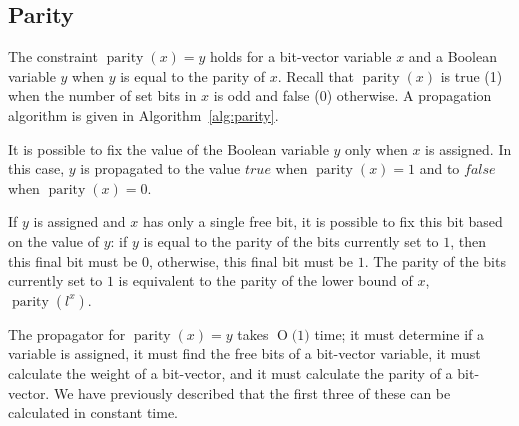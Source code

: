 \documentclass[a4paper,10pt,twoside,openright]{book}
\newcommand{\BigO}[1]{\ensuremath{\operatorname{O}\bigl(#1\bigr)}}
\newcommand*\cd[1]{\texttt{#1}}
\DeclareMathOperator{\parity}{parity}
\DeclareMathOperator{\weight}{weight}
\begin{document}

\subsection{Parity}
\label{sec:parityprop}
The constraint $\parity(x) = y$ holds for a bit-vector variable $x$ and a Boolean variable $y$ when 
$y$ is equal to the parity of $x$. Recall that $\parity(x)$ is true (1) when the number of set bits in $x$ is odd and false (0) otherwise.
A propagation algorithm is given in Algorithm~\ref{alg:parity}. 

It is possible to fix the value of the Boolean variable $y$ only when $x$ is assigned.
In this case, $y$ is propagated to the value $\mathit{true}$ when $\parity(x) = 1$
and to $\mathit{false}$ when $\parity(x) = 0$.

If $y$ is assigned and $x$ has only a single free bit,
it is possible to fix this bit based on the value of $y$:
if $y$ is equal to the parity of the bits currently set to $1$,
then this final bit must be $0$, otherwise, this final bit must be $1$.
The parity of the
bits currently set to $1$ is equivalent to the parity of the lower bound of $x$, 
$\parity(l^x)$.

The propagator for $\parity(x) = y$ takes $\BigO{1}$ time;
it must determine if a variable is assigned,
it must find the free bits of a bit-vector variable,
it must calculate the weight of a bit-vector,
and it must calculate the parity of a bit-vector.
We have previously described that the 
first three of these 
can be calculated in constant time.
\end{document}
